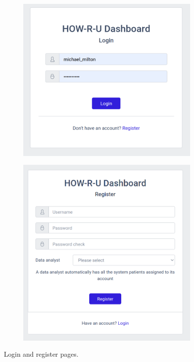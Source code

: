 \documentclass[12pt,english]{article}
\begin{document}
\begin{figure}[H]
  \begin{subfigure}[t]{0.4\textwidth}
    \centering
    \includegraphics[width=\textwidth]{login.png}
  \end{subfigure}
  \hspace{3cm}
  \begin{subfigure}[t]{0.4\textwidth}
    \centering
    \includegraphics[width=\textwidth]{register.png}
  \end{subfigure}
  \caption{Login and register pages.}
\end{figure}
\end{document}
